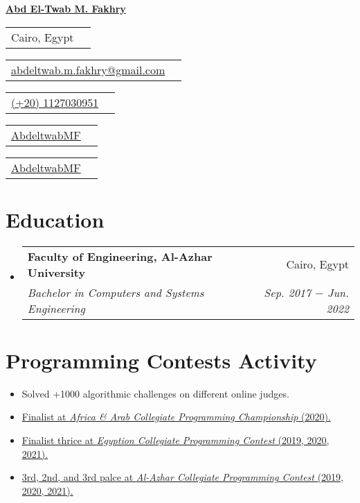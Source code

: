 \documentclass[letterpaper, 11pt]{article}
\makeatletter
\newcommand{\infoItem}[3] {
  \begin{tabular}{lr}
    {\color{#1}\faIcon{#2} {#3}}
  \end{tabular}
}
\newcommand{\educationItem}[4] {
  \vspace{-1pt}\item
  \begin{tabular*}{0.97\textwidth}[t]{l@{\extracolsep{\fill}}r}
    \textbf{#1} & #2 \\
    \textit{\small #3} & \textit{\small #4} \\
  \end{tabular*}\vspace{-5pt}
}
\newcommand{\progContItem}[1] {\item\small{#1 \vspace{-2pt}}}
\makeatother
\begin{document}

\textbf{\href{http://abdeltwabmf.me}{\Huge{Abd El-Twab M. Fakhry}}} \\[2pt]

\begin{minipage}[t]{0.150\textwidth}
  \infoItem{RedViolet}{location-arrow}{Cairo, Egypt}
\end{minipage}
\begin{minipage}[t]{0.32\textwidth}
  \infoItem{RoyalPurple}{envelope}{\href{mailto:abdeltwab.m.fakhry@gmail.com}{abdeltwab.m.fakhry@gmail.com}}
\end{minipage}
\begin{minipage}[t]{0.185\textwidth}
  \infoItem{JungleGreen}{mobile-alt}{\href{tel:+201127030951}{(+20) 1127030951}}
\end{minipage}
\begin{minipage}[t]{0.16\textwidth}
  \infoItem{RoyalBlue}{linkedin}{\href{https://www.linkedin.com/in/abdeltwabmf/}{AbdeltwabMF}}
\end{minipage}
\begin{minipage}[t]{0.147\textwidth}
  \infoItem{Black}{github}{\href{https://github.com/AbdeltwabMF}{AbdeltwabMF}}
\end{minipage}

\section{Education}
\begin{itemize}[leftmargin=*]
  \educationItem{\faIcon{university} Faculty of Engineering, Al-Azhar University}{ Cairo, Egypt}{ Bachelor in Computers and Systems Engineering}{ Sep. 2017 $-$ Jun. 2022}
\end{itemize}

\section{Programming Contests Activity}
\begin{itemize}[leftmargin=*]
  \progContItem{Solved +1000 algorithmic challenges on different online judges.}
  \progContItem{\href{https://icpc.global/ICPCID/S6R4YNB7PW7D}{Finalist at \emph{Africa \& Arab Collegiate Programming Championship} (2020).}}
  \progContItem{\href{https://icpc.global/ICPCID/S6R4YNB7PW7D}{Finalist thrice at \emph{Egyption Collegiate Programming Contest} (2019, 2020, 2021).}}
  \progContItem{\href{https://icpc.global/ICPCID/S6R4YNB7PW7D}{3rd, 2nd, and 3rd palce at \emph{Al-Azhar Collegiate Programming Contest} (2019, 2020, 2021).}}
\end{itemize}
\end{document}
